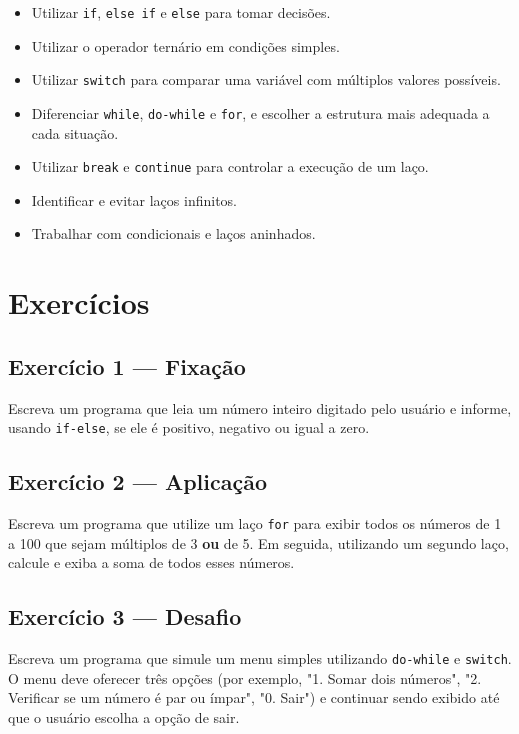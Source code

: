 \documentclass[12pt,a4paper,oneside]{extreport}
\begin{document}
\begin{tcolorbox}[title={Ao final deste capítulo, você deve ser capaz de:}]
\begin{itemize}
    \item Utilizar \texttt{if}, \texttt{else if} e \texttt{else} para tomar decisões.
    \item Utilizar o operador ternário em condições simples.
    \item Utilizar \texttt{switch} para comparar uma variável com múltiplos valores possíveis.
    \item Diferenciar \texttt{while}, \texttt{do-while} e \texttt{for}, e escolher a estrutura mais adequada a cada situação.
    \item Utilizar \texttt{break} e \texttt{continue} para controlar a execução de um laço.
    \item Identificar e evitar laços infinitos.
    \item Trabalhar com condicionais e laços aninhados.
\end{itemize}
\end{tcolorbox}

\section*{Exercícios}

\subsection*{Exercício 1 --- Fixação}
Escreva um programa que leia um número inteiro digitado pelo usuário e informe, usando \texttt{if-else}, se ele é positivo, negativo ou igual a zero.

\subsection*{Exercício 2 --- Aplicação}
Escreva um programa que utilize um laço \texttt{for} para exibir todos os números de 1 a 100 que sejam múltiplos de 3 \textbf{ou} de 5. Em seguida, utilizando um segundo laço, calcule e exiba a soma de todos esses números.

\subsection*{Exercício 3 --- Desafio}
Escreva um programa que simule um menu simples utilizando \texttt{do-while} e \texttt{switch}. O menu deve oferecer três opções (por exemplo, "1. Somar dois números", "2. Verificar se um número é par ou ímpar", "0. Sair") e continuar sendo exibido até que o usuário escolha a opção de sair.
\end{document}
